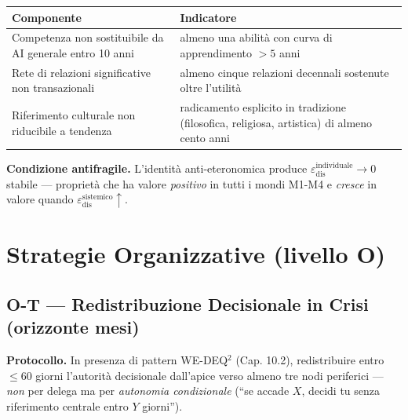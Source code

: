 {\def\LTcaptype{none} %
{\small\begin{longtable}[]{@{}
  >{\raggedright\arraybackslash}p{}
  >{\raggedright\arraybackslash}p{}@{}}
\toprule\noalign{}
\begin{minipage}[b]{\linewidth}\raggedright
Componente
\end{minipage} & \begin{minipage}[b]{\linewidth}\raggedright
Indicatore
\end{minipage} \\
\midrule\noalign{}
\endhead
\bottomrule\noalign{}
\endlastfoot
Competenza non sostituibile da AI generale entro 10 anni & almeno una
abilità con curva di apprendimento \(> 5\) anni \\
Rete di relazioni significative non transazionali & almeno cinque
relazioni decennali sostenute oltre l'utilità \\
Riferimento culturale non riducibile a tendenza & radicamento esplicito
in tradizione (filosofica, religiosa, artistica) di almeno cento anni \\
\end{longtable}}
}

\Proved{} \textbf{Condizione antifragile.} L'identità anti-eteronomica
produce \(\varepsilon_{\text{dis}}^{\text{individuale}} \to 0\) stabile
--- proprietà che ha valore \emph{positivo} in tutti i mondi M1-M4 e
\emph{cresce} in valore quando
\(\varepsilon_{\text{dis}}^{\text{sistemico}} \uparrow\).



\section{Strategie Organizzative (livello
O)}\label{strategie-organizzative-livello-o}

\subsection{O-T --- Redistribuzione Decisionale in Crisi (orizzonte
mesi)}\label{o-t-redistribuzione-decisionale-in-crisi-orizzonte-mesi}

\Hypoth{} \textbf{Protocollo.} In presenza di pattern WE-DEQ$^2$ (Cap.
10.2), redistribuire entro \(\leq 60\) giorni l'autorità decisionale
dall'apice verso almeno tre nodi periferici --- \emph{non} per delega ma
per \emph{autonomia condizionale} (``se accade \(X\), decidi tu senza
riferimento centrale entro \(Y\) giorni'').

